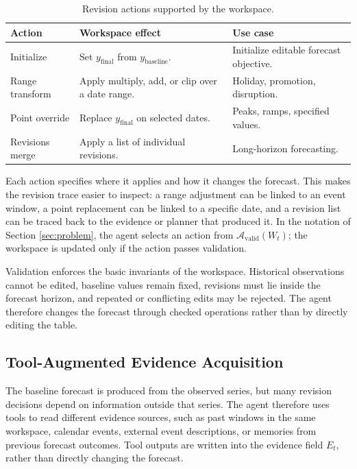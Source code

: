 \documentclass{article}
\theoremstyle{plain}
\theoremstyle{definition}
\theoremstyle{remark}
\begin{document}
\begin{table}[t]
\centering
\small
\caption{Revision actions supported by the workspace.}
\label{tab:revision-actions}
\begin{tabularx}{\linewidth}{@{}lXX@{}}
\toprule
\textbf{Action} & \textbf{Workspace effect} & \textbf{Use case} \\
\midrule
Initialize & Set \(y_{\text{final}}\) from \(y_{\text{baseline}}\). & Initialize editable forecast objective. \\
Range transform & Apply multiply, add, or clip over a date range. & Holiday, promotion, disruption. \\
Point override & Replace \(y_{\text{final}}\) on selected dates. & Peaks, ramps, specified values. \\
Revisions merge & Apply a list of individual revisions. & Long-horizon forecasting. \\
\bottomrule
\end{tabularx}
\end{table}

Each action specifies where it applies and how it changes the forecast. This makes the revision trace easier to inspect: a range adjustment can be linked to an event window, a point replacement can be linked to a specific date, and a revision list can be traced back to the evidence or planner that produced it. In the notation of Section \ref{sec:problem}, the agent selects an action from \(\mathcal{A}_{\text{valid}}(W_t)\); the workspace is updated only if the action passes validation.

Validation enforces the basic invariants of the workspace. Historical observations cannot be edited, baseline values remain fixed, revisions must lie inside the forecast horizon, and repeated or conflicting edits may be rejected. The agent therefore changes the forecast through checked operations rather than by directly editing the table.

\subsection{Tool-Augmented Evidence Acquisition}
The baseline forecast is produced from the observed series, but many revision decisions depend on information outside that series. The agent therefore uses tools to read different evidence sources, such as past windows in the same workspace, calendar events, external event descriptions, or memories from previous forecast outcomes. Tool outputs are written into the evidence field \(E_t\), rather than directly changing the forecast.
\end{document}

